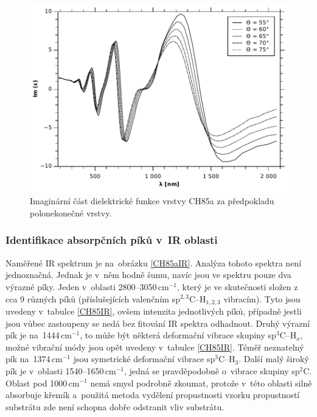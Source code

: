 \documentclass[12pt]{article}
\begin{document}
\begin{figure}
  \centering
  \includegraphics[width=135mm]{img/CH85-Ime.pdf}
  \caption{Imaginární část dielektrické funkce vrstvy CH85a za předpokladu polonekonečné vrstvy.}
  \label{CH85Ime}
\end{figure}


\subsubsection{Identifikace absorpčních píků v~IR oblasti }
Naměřené IR spektrum je na~obrázku \ref{CH85aIR}. Analýza tohoto spektra není jednoznačná. Jednak je v~něm hodně šumu, navíc jsou ve spektru pouze dva výrazné píky. Jeden v~oblasti 2800--3050\,cm$^{-1}$, který je ve skutečnosti složen z cca 9 různých píků (příslušejících valenčním sp$^{2,3}$C--H$_{1,2,3}$ vibracím). Tyto jsou uvedeny v~tabulce \ref{CH85IR}, ovšem intenzita jednotlivých píků, případně jestli jsou vůbec zastoupeny se nedá bez fitování IR spektra odhadnout. Druhý výrazní pík je na~1444\,cm$^{-1}$, to může být některá deformační vibrace skupiny sp$^3$C--H$_x$, možné vibrační módy jsou opět uvedeny v~tabulce \ref{CH85IR}. Téměř neznatelný pík na~1374\,cm$^{-1}$ jsou symetrické deformační vibrace sp$^3$C--H$_3$. Další malý široký pík je v~oblasti 1540--1650\,cm$^{-1}$, jedná se pravděpodobně o~vibrace skupiny sp$^2$C. Oblast pod 1000\,cm$^{-1}$ nemá smysl podrobně zkoumat, protože v~této oblasti silně absorbuje křemík a~použitá metoda vydělení propustnosti vzorku propustností substrátu zde není schopna dobře odstranit vliv substrátu.
 
\end{document}
